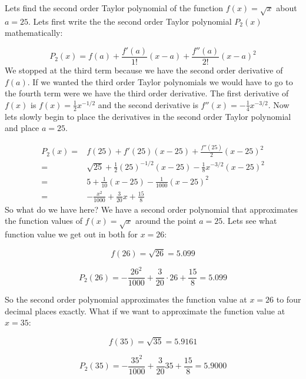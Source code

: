 \documentclass[main.tex]{subfiles}
\begin{document}
\begin{example}
Lets find the second order Taylor polynomial of the function $f(x) = \sqrt{x}$ about $a=25$. Lets first write the the second order Taylor polynomial $P_2(x)$ mathematically:

\begin{equation}
P_2(x) = f(a) + \frac{f'(a)}{1!}(x-a) + \frac{f''(a)}{2!}(x-a)^2
\end{equation}
We stopped at the third term because we have the second order derivative of $f(a)$. If we wanted the third order Taylor polynomials we would have to go to the fourth term were we have the third order derivative. The first derivative of $f(x)$ is $f(x)=\frac{1}{2}x^{-1/2}$ and the second derivative is $f''(x) = -\frac{1}{4}x^{-3/2}$. Now lets slowly begin to place the derivatives in the second order Taylor polynomial and place $a=25$.

\begin{align}
P_2(x) =& f(25) +f'(25)(x-25) + \frac{f''(25)}{2}(x-25)^2\\
=& \sqrt{25} + \frac{1}{2}(25)^{-1/2}(x-25) -\frac{1}{8}x^{-3/2}(x-25)^2 \\
=& 5 + \frac{1}{10}(x-25) - \frac{1}{1000}(x-25)^2 \\
=& -\frac{x^2}{1000} + \frac{3}{20}x + \frac{15}{8}
\end{align}  
So what do we have here? We have a second order polynomial that approximates the function values of $f(x)=\sqrt{x}$ around the point $a=25$. Lets see what function value we get out in both for $x = 26$:

\begin{equation}
f(26) = \sqrt{26} = 5.099
\end{equation}

\begin{equation}
P_2(26) = -\frac{26^2}{1000} + \frac{3}{20} \cdot 26 + \frac{15}{8} = 5.099
\end{equation}

So the second order polynomial approximates the function value at $x = 26$ to four decimal places exactly. What if we want to approximate the function value at $x=35$:

\begin{equation}
f(35) = \sqrt{35} = 5.9161
\end{equation}

\begin{equation}
P_2(35) = -\frac{35^2}{1000} + \frac{3}{20}35 + \frac{15}{8} = 5.9000
\end{equation}


\end{example}
\end{document}
